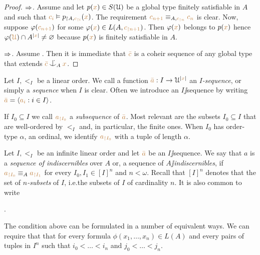 \documentclass[creche.tex]{subfiles}
\begin{document}
\begin{proof}
$\Rightarrow$.
Assume  and let $p({\color{brown} x})\in S(\EuScript U)$ be a global type finitely satisfiable in $A$ and such that ${\color{brown} c_i}\vDash p_{\restriction A,{\color{brown} c_{\restriction i}}}({\color{brown} x})$.
The requirement ${\color{brown} c_{n+1}}\equiv_{A,{\color{brown} c_{\restriction n}}} {\color{brown} c_n}$ is clear.
Now, suppose $\varphi({\color{brown} c_{n+1}})$ for some $\varphi({\color{brown} x})\in L(A,{\color{brown} c_{\restriction n+1}})$.
Then $\varphi({\color{brown} x})$ belongs to $p({\color{brown} x})$ hence $\varphi({\color{brown}\EuScript U})\cap A^{|{\color{brown} x}|}\neq\varnothing$ because $p({\color{brown} x})$ is finitely satisfiable in $A$.

$\Rightarrow$.
Assume .
Then it is immediate that ${\color{brown}\bar c}$ is a coheir sequence of any global type that extends ${\mr\bar c}\nonforkc_A{\mr x}$.
\end{proof}

Let $I,<_I$ be a linear order.
We call a function ${\color{brown}\bar a}:I\to\EuScript U^{|{\color{brown} x}|}$ an \emph{$I$-sequence}, or simply a \emph{sequence\/} when $I$ is clear.
Often we introduce an $I\jj$sequence by writing ${\color{brown}\bar a}=\langle{\color{brown}a_i}: i\in I\rangle$.


If $I_0\subseteq I$ we call ${\color{brown} a_{\restriction I_0}}$ a \emph{subsequence\/} of ${\color{brown}\bar a}$.
Most relevant are the subsets $I_0\subseteq I$ that are well-ordered by $<_I$ and, in particular, the finite ones.
When $I_0$ has order-type $\alpha$, an ordinal, we identify ${\color{brown} a_{\restriction I_0}}$ with a tuple of length $\alpha$.
 
\begin{definition}
Let $I,<_I$ be an infinite linear order and let ${\color{brown}\bar a}$ be an $I\jj$sequence.
We say that $a$ is a \emph{sequence of indiscernibles\/} over $A$ or, a sequence of \emph{$A\jj$indiscernibles}, if ${\color{brown} a_{\restriction I_0}}\equiv_A {\color{brown} a_{\restriction I_1}}$ for every $I_0,I_1\in [I]^n$ and $n<\omega$.
Recall that \emph{$[I]^n$} denotes that the set of \emph{$n$-subsets\/} of $I$,  i.e.\@ the subsets of $I$ of cardinality $n$.
It is also common to write\smallskip

.\QED
\end{definition}

The condition above can be formulated in a number of equivalent ways.
We can require that that for every formula $\phi(x_1,\dots,x_n)\in L(A)$ and every pairs of tuples in $I^n$ such that $i_0<\dots<i_n$ and $j_0<\dots<j_n$.


\end{document}
